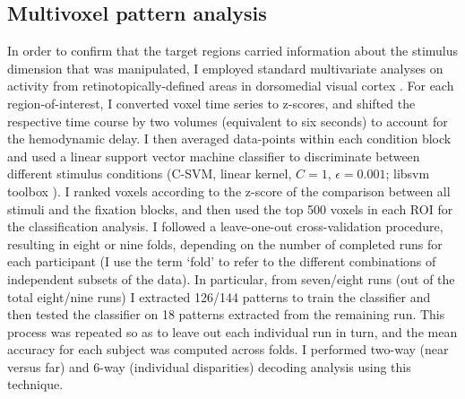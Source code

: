 \subsection{Multivoxel pattern analysis}
In order to confirm that the target regions carried information about the stimulus dimension that was manipulated, I employed standard multivariate analyses on activity from retinotopically-defined areas in dorsomedial visual cortex \cite{Preston:2008dg}. For each region-of-interest, I converted voxel time series to z-scores, and shifted the respective time course by two volumes (equivalent to six seconds) to account for the hemodynamic delay. I then averaged data-points within each condition block and used a linear support vector machine classifier to discriminate between different stimulus conditions (C-SVM, linear kernel, $C=1$, $\epsilon=0.001$; libsvm toolbox \cite{Chang:2011:LLS:1961189.1961199}). I ranked voxels according to the z-score of the comparison between all stimuli and the fixation blocks, and then used the top 500 voxels in each ROI for the classification analysis. I followed a leave-one-out cross-validation procedure, resulting in eight or nine folds, depending on the number of completed runs for each participant (I use the term `fold' to refer to the different combinations of independent subsets of the data). In particular, from seven/eight runs (out of the total eight/nine runs) I extracted 126/144 patterns to train the classifier and then tested the classifier on 18 patterns extracted from the remaining run. This process was repeated so as to leave out each individual run in turn, and the mean accuracy for each subject was computed across folds. I performed two-way (near versus far) and 6-way (individual disparities) decoding analysis using this technique.

